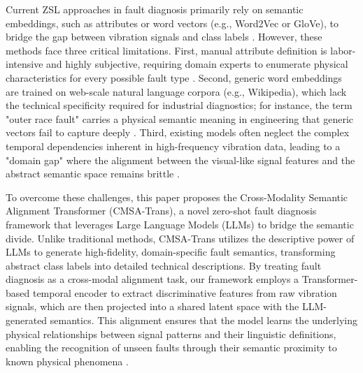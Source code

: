 \documentclass[journal]{IEEEtran}
\begin{document}
Current ZSL approaches in fault diagnosis primarily rely on semantic embeddings, such as attributes or word vectors (e.g., Word2Vec or GloVe), to bridge the gap between vibration signals and class labels \cite{lampert2014attribute}. However, these methods face three critical limitations. First, manual attribute definition is labor-intensive and highly subjective, requiring domain experts to enumerate physical characteristics for every possible fault type \cite{fu2018zero}. Second, generic word embeddings are trained on web-scale natural language corpora (e.g., Wikipedia), which lack the technical specificity required for industrial diagnostics; for instance, the term "outer race fault" carries a physical semantic meaning in engineering that generic vectors fail to capture deeply \cite{mikolov2013efficient}. Third, existing models often neglect the complex temporal dependencies inherent in high-frequency vibration data, leading to a "domain gap" where the alignment between the visual-like signal features and the abstract semantic space remains brittle \cite{xian2018zero, buchert2020zero}.

To overcome these challenges, this paper proposes the Cross-Modality Semantic Alignment Transformer (CMSA-Trans), a novel zero-shot fault diagnosis framework that leverages Large Language Models (LLMs) to bridge the semantic divide. Unlike traditional methods, CMSA-Trans utilizes the descriptive power of LLMs to generate high-fidelity, domain-specific fault semantics, transforming abstract class labels into detailed technical descriptions. By treating fault diagnosis as a cross-modal alignment task, our framework employs a Transformer-based temporal encoder to extract discriminative features from raw vibration signals, which are then projected into a shared latent space with the LLM-generated semantics. This alignment ensures that the model learns the underlying physical relationships between signal patterns and their linguistic definitions, enabling the recognition of unseen faults through their semantic proximity to known physical phenomena \cite{vaswani2017attention, radford2021learning}.
\end{document}
